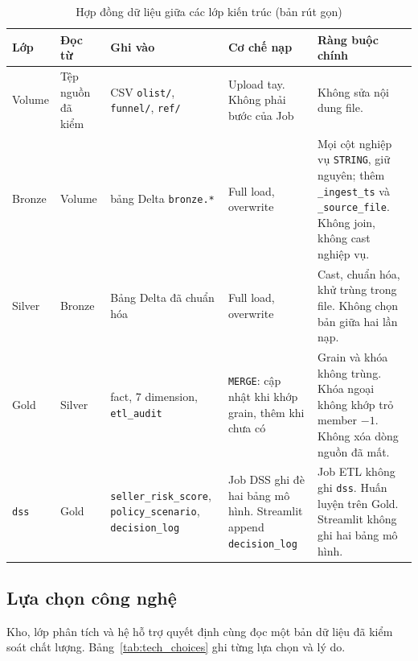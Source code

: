 \documentclass[a4paper]{article}
\begin{document}
\begin{table}[htbp]
\centering
\footnotesize
\setlength{\tabcolsep}{3pt}
\renewcommand{\arraystretch}{1.08}
\caption{Hợp đồng dữ liệu giữa các lớp kiến trúc (bản rút gọn)}
\label{tab:layer_contract}
\begin{tabularx}{\textwidth}{@{}>{\raggedright\arraybackslash}p{1.45cm}*{4}{>{\raggedright\arraybackslash}X}@{}}
\toprule
\textbf{Lớp} & \textbf{Đọc từ} & \textbf{Ghi vào} & \textbf{Cơ chế nạp} & \textbf{Ràng buộc chính} \\
\midrule
Volume & Tệp nguồn đã kiểm & CSV \texttt{olist/}, \texttt{funnel/}, \texttt{ref/} & Upload tay. Không phải bước của Job & Không sửa nội dung file. \\
\addlinespace
Bronze & Volume & 12 bảng Delta \texttt{bronze.*} & Full load, overwrite & Mọi cột nghiệp vụ \texttt{STRING}, giữ nguyên; thêm \texttt{\_ingest\_ts} và \texttt{\_source\_file}. Không join, không cast nghiệp vụ. \\
\addlinespace
Silver & Bronze & Bảng Delta đã chuẩn hóa & Full load, overwrite & Cast, chuẩn hóa, khử trùng trong file. Không chọn bản giữa hai lần nạp. \\
\addlinespace
Gold & Silver & 3 fact, 7 dimension, \texttt{etl\_audit} & \texttt{MERGE}: cập nhật khi khớp grain, thêm khi chưa có & Grain và khóa không trùng. Khóa ngoại không khớp trỏ member $-1$. Không xóa dòng nguồn đã mất. \\
\addlinespace
\texttt{dss} & Gold & \texttt{seller\_risk\_score}, \texttt{policy\_scenario}, \texttt{decision\_log} & Job DSS ghi đè hai bảng mô hình. Streamlit append \texttt{decision\_log} & Job ETL không ghi \texttt{dss}. Huấn luyện trên Gold. Streamlit không ghi hai bảng mô hình. \\
\bottomrule
\end{tabularx}
\end{table}

\subsection{Lựa chọn công nghệ}
\label{subsec:3_5}

Kho, lớp phân tích và hệ hỗ trợ quyết định cùng đọc một bản dữ liệu đã kiểm soát chất lượng. Bảng~\ref{tab:tech_choices} ghi từng lựa chọn và lý do.
\end{document}
